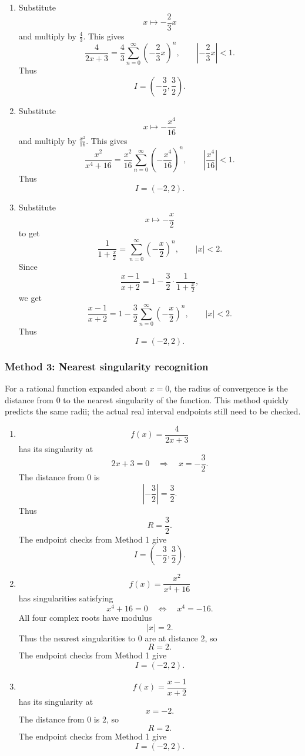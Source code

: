 \documentclass[12pt]{article}
\begin{document}
\begin{enumerate}[label=(\alph*)]
\item Substitute
\[
x\mapsto -\frac23x
\]
and multiply by \(\frac43\). This gives
\[
\frac4{2x+3}
=
\frac43\sum_{n=0}^{\infty}\left(-\frac23x\right)^n,
\qquad
\left|-\frac23x\right|<1.
\]
Thus
\[
\boxed{I=\left(-\frac32,\frac32\right)}.
\]

\item Substitute
\[
x\mapsto -\frac{x^4}{16}
\]
and multiply by \(\frac{x^2}{16}\). This gives
\[
\frac{x^2}{x^4+16}
=
\frac{x^2}{16}\sum_{n=0}^{\infty}\left(-\frac{x^4}{16}\right)^n,
\qquad
\left|\frac{x^4}{16}\right|<1.
\]
Thus
\[
\boxed{I=(-2,2)}.
\]

\item Substitute
\[
x\mapsto -\frac x2
\]
to get
\[
\frac1{1+\frac x2}
=
\sum_{n=0}^{\infty}\left(-\frac x2\right)^n,
\qquad |x|<2.
\]
Since
\[
\frac{x-1}{x+2}
=
1-\frac32\cdot\frac1{1+\frac x2},
\]
we get
\[
\frac{x-1}{x+2}
=
1-\frac32\sum_{n=0}^{\infty}\left(-\frac x2\right)^n,
\qquad |x|<2.
\]
Thus
\[
\boxed{I=(-2,2)}.
\]
\end{enumerate}

\bigskip
\subsubsection*{Method 3: Nearest singularity recognition}
For a rational function expanded about \(x=0\), the radius of convergence is the distance from \(0\) to the nearest singularity of the function. This method quickly predicts the same radii; the actual real interval endpoints still need to be checked.

\begin{enumerate}[label=(\alph*)]
\item
\[
f(x)=\frac4{2x+3}
\]
has its singularity at
\[
2x+3=0
\quad\Longrightarrow\quad
x=-\frac32.
\]
The distance from \(0\) is
\[
\left|-\frac32\right|=\frac32.
\]
Thus
\[
R=\frac32.
\]
The endpoint checks from Method 1 give
\[
\boxed{I=\left(-\frac32,\frac32\right)}.
\]


\newpage
\item
\[
f(x)=\frac{x^2}{x^4+16}
\]
has singularities satisfying
\[
x^4+16=0
\quad\Longleftrightarrow\quad
x^4=-16.
\]
All four complex roots have modulus
\[
|x|=2.
\]
Thus the nearest singularities to \(0\) are at distance \(2\), so
\[
R=2.
\]
The endpoint checks from Method 1 give
\[
\boxed{I=(-2,2)}.
\]

\item
\[
f(x)=\frac{x-1}{x+2}
\]
has its singularity at
\[
x=-2.
\]
The distance from \(0\) is \(2\), so
\[
R=2.
\]
The endpoint checks from Method 1 give
\[
\boxed{I=(-2,2)}.
\]
\end{enumerate}
\end{document}

